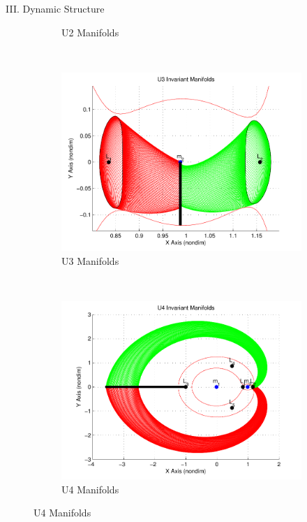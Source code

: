 \documentclass[final, usenames, dvipsnames]{beamer}
\newlength{\twocolwidth}
\begin{document}
\begin{frame}[t]
\begin{columns}[T,onlytextwidth]
\begin{column}{\twocolwidth}
\begin{block}{III. Dynamic Structure}
\begin{figure}
\begin{subfigure}[b]{0.24\columnwidth}
                \caption*{U2 Manifolds}
                \label{fig:u2_manifolds}
        \end{subfigure}
        ~%
        \begin{subfigure}[b]{0.24\columnwidth}
                \includegraphics[width=\columnwidth]{U3_Manifolds}
                \caption*{U3 Manifolds}
                \label{fig:u3_manifolds}
        \end{subfigure}%
        ~%
        \begin{subfigure}[b]{0.24\columnwidth}
                \includegraphics[width=\columnwidth]{U4_Manifolds}
                \caption*{U4 Manifolds}
                \label{fig:u4_manifolds}
        \end{subfigure}
		\label{fig:invariant_manifolds}
	\end{figure}
\end{block} %


\end{column}
\end{columns}
\end{frame}
\end{document}
